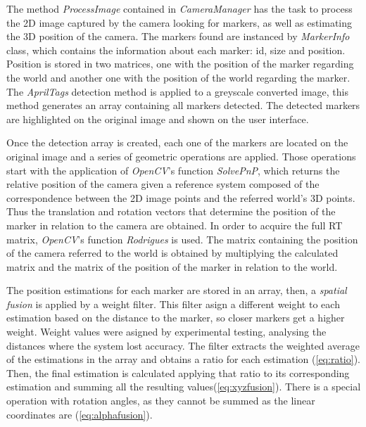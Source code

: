 \documentclass{styles/svproc}
\begin{document}
	
	
	The method \textit{ProcessImage} contained in \textit{CameraManager} has the task to process the 2D image captured by the camera looking for markers, as well as estimating the 3D position of the camera. The markers found are instanced by \textit{MarkerInfo} class, which contains the information about each marker: id, size and position. Position is stored in two matrices, one with the position of the marker regarding the world and another one with the position of the world regarding the marker. The \textit{AprilTags} detection method is applied to a greyscale converted image, this method generates an array containing all markers detected. The detected markers are highlighted on the original image and shown on the user interface.
	
	Once the detection array is created, each one of the markers are located on the original image and a series of geometric operations are applied. Those operations start with the application of \textit{OpenCV}'s function \textit{SolvePnP}, which returns the relative position of the camera given a reference system composed of the correspondence between the 2D image points and the referred world's 3D points. Thus the translation and rotation vectors that determine the position of the marker in relation to the camera are obtained. In order to acquire the full RT matrix, \textit{OpenCV}'s function \textit{Rodrigues} is used. The matrix containing the position of the camera referred to the world is obtained by multiplying the calculated matrix and the matrix of the position of the marker in relation to the world.
	
	The position estimations for each marker are stored in an array, then, a \textit{spatial fusion} is applied by a weight filter. This filter asign a different weight to each estimation based on the distance to the marker, so closer markers get a higher weight. Weight values were asigned by experimental testing, analysing the distances where the system lost accuracy. The filter extracts the weighted average of the estimations in the array and obtains a ratio for each estimation (\ref{eq:ratio}). Then, the final estimation is calculated applying that ratio to its corresponding estimation and summing all the resulting values(\ref{eq:xyzfusion}). There is a special operation with rotation angles, as they cannot be summed as the linear coordinates are (\ref{eq:alphafusion}).
	
\end{document}

